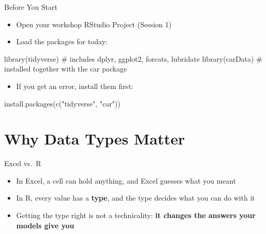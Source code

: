 \documentclass[
  ignorenonframetext,
  aspectratio=169,
]{beamer}
\newenvironment{Shaded}{\begin{snugshade}}{\end{snugshade}}
\newcommand{\CommentTok}[1]{\textcolor[rgb]{0.37,0.37,0.37}{#1}}
\newcommand{\FunctionTok}[1]{\textcolor[rgb]{0.28,0.35,0.67}{#1}}
\newcommand{\NormalTok}[1]{\textcolor[rgb]{0.00,0.23,0.31}{#1}}
\newcommand{\StringTok}[1]{\textcolor[rgb]{0.13,0.47,0.30}{#1}}
\providecommand{\tightlist}{%
  \setlength{\itemsep}{0pt}\setlength{\parskip}{0pt}}\usepackage{longtable,booktabs,array}
\begin{document}
\begin{frame}[fragile]{Before You Start}
\protect\hypertarget{before-you-start}{}
\begin{itemize}
\tightlist
\item
  Open your workshop RStudio Project (Session 1)
\item
  Load the packages for today:
\end{itemize}

\begin{Shaded}
\begin{Highlighting}[]
\FunctionTok{library}\NormalTok{(tidyverse)   }\CommentTok{\# includes dplyr, ggplot2, forcats, lubridate}
\FunctionTok{library}\NormalTok{(carData)     }\CommentTok{\# installed together with the car package}
\end{Highlighting}
\end{Shaded}

\begin{itemize}
\tightlist
\item
  If you get an error, install them first:
\end{itemize}

\begin{Shaded}
\begin{Highlighting}[]
\FunctionTok{install.packages}\NormalTok{(}\FunctionTok{c}\NormalTok{(}\StringTok{"tidyverse"}\NormalTok{, }\StringTok{"car"}\NormalTok{))}
\end{Highlighting}
\end{Shaded}
\end{frame}

\hypertarget{sec-why}{%
\section{Why Data Types Matter}\label{sec-why}}

\begin{frame}{Excel vs.~R}
\protect\hypertarget{excel-vs.-r}{}
\begin{itemize}
\tightlist
\item
  In Excel, a cell can hold anything, and Excel guesses what you meant
\item
  In R, every value has a \textbf{type}, and the type decides what you
  can do with it
\item
  Getting the type right is not a technicality: \textbf{it changes the
  answers your models give you}
\end{itemize}
\end{frame}
\end{document}
